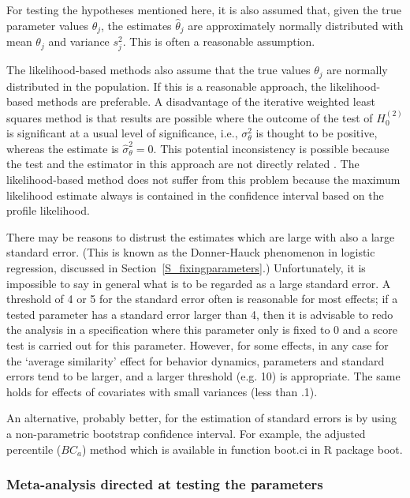 \documentclass[a4paper,fleqn,11pt]{article}
\newcommand{\+}{\, + \,}
\newcommand{\R}{{\sf R }}
\begin{document}
For testing the hypotheses mentioned here, it is also assumed that,
given the true parameter values $\theta_j$, the
estimates $\hat{\theta}_j$ are approximately normally distributed
with mean $\theta_j$ and variance $s^2_j$.
This is often a reasonable assumption.

The likelihood-based methods also assume that the true values
$\theta_j$ are normally distributed in the population.
If this is a reasonable approach, the likelihood-based methods
are preferable.
A disadvantage of the iterative weighted least squares method
is that results are possible
where the outcome of the test of $H_0^{(2)}$ is significant
at a usual level of significance,
i.e., $\sigma^2_\theta$ is thought to be positive, whereas
the estimate is $\hat\sigma^2_\theta = 0$.
This  potential inconsistency is possible because the test
and the estimator in this approach are not directly related
\citep[cf.][]{SnijdersBaerveldt03}.
The likelihood-based method does not suffer from this problem
because the maximum likelihood estimate always is contained
in the confidence interval based on the profile likelihood.
\bigskip

There may be reasons to distrust the estimates which are
large with also a large standard error. (This is known as the Donner-Hauck
phenomenon in logistic regression, discussed in
Section~\ref{S_fixingparameters}.)
Unfortunately, it is impossible to say in
general what is to be regarded as a large standard error.
A threshold of 4 or 5 for the standard error often is reasonable
for most effects; if a tested
parameter has a standard error larger than 4, then it is advisable to redo
the analysis in a specification where this parameter only is fixed to 0 and a
score test is carried out for this parameter. However, for some effects, in
any case for the `average similarity' effect for behavior dynamics,
parameters and standard errors tend to be larger, and a larger threshold
(e.g. 10) is appropriate. The same holds for effects of covariates with small
variances (less than .1).

An alternative, probably better, for the estimation of standard errors
is by using a non-parametric bootstrap confidence interval. For example, the
adjusted percentile ($BC_a$) method
\citep[][Chapter 5]{Efron1987,DavisonHinkley1997}
which is available in function \textsf{boot.ci} in \R package \textsf{boot}.


\subsubsection{Meta-analysis directed at testing the parameters}
\end{document}
